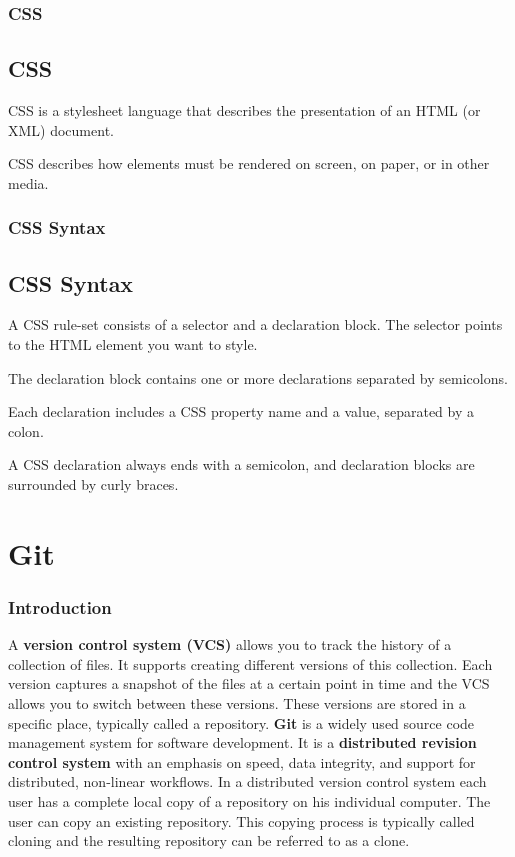 \documentclass{beamer}
\begin{document}
\begin{frame}
\frametitle{CSS}
\subsection{CSS}
CSS is a stylesheet language that describes the presentation of an HTML (or XML) document.

CSS describes how elements must be rendered on screen, on paper, or in other media.
\end{frame}

\begin{frame}
\frametitle{CSS Syntax}
\subsection{CSS Syntax}
A CSS rule-set consists of a selector and a declaration block.
The selector points to the HTML element you want to style.

The declaration block contains one or more declarations separated by semicolons.

Each declaration includes a CSS property name and a value, separated by a colon.

A CSS declaration always ends with a semicolon, and declaration blocks are surrounded by curly braces.
\end{frame}
    
\section{Git}
\begin{frame}
\frametitle{Introduction}

A \textbf{version control system (VCS)} allows you to track the history of a collection of files. It supports creating different versions of this collection. Each version captures a snapshot of the files at a certain point in time and the VCS allows you to switch between these versions. These versions are stored in a specific place, typically called a repository.
	\textbf{Git} is a widely used source code management system for software development. It is a \textbf{distributed revision control system} with an emphasis on speed, data integrity, and support for distributed, non-linear workflows. In a distributed version control system each user has a complete local copy of a repository on his individual computer. The user can copy an existing repository. This copying process is typically called cloning and the resulting repository can be referred to as a clone.
\end{frame}
\end{document}
